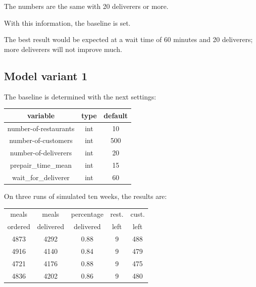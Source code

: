 The numbers are the same with 20 deliverers or more.

With this information, the baseline is set.

The best result would be expected at a wait time of 60 minutes and 20 deliverers; more deliverers will not improve much.

\subsection{Model variant 1}\label{subsec:model-variant-1}
The baseline is determined with the next settings:
\begin{center}
    \begin{tabular}{ |c|c|c| }
        \hline
        variable              & type & default \\
        \hline
        \hline
        number-of-restaurants & int  & 10      \\
        \hline
        number-of-customers   & int  & 500     \\
        \hline
        number-of-deliverers  & int  & 20      \\
        \hline
        prepair\_time\_mean   & int  & 15      \\
        \hline
        wait\_for\_deliverer  & int  & 60      \\
        \hline
    \end{tabular}
\end{center}

On three runs of simulated ten weeks, the results are:

\begin{center}
    \begin{tabular}{ |c|c|c|c|c| }
        \hline
        meals & meals &  percentage  &  rest. & cust.  \\
        ordered & delivered & delivered &  left  & left \\
        \hline
        \hline
        4873          & 4292           & 0.88             & 9  & 488                \\
        \hline
        4916          & 4140           & 0.84             & 9  & 479               \\
        \hline
        4721          & 4176           & 0.88            & 9   & 475              \\
        \hline
        \hline
        4836          & 4202           & 0.86             & 9 & 480  \\
        \hline
    \end{tabular}
\end{center}

